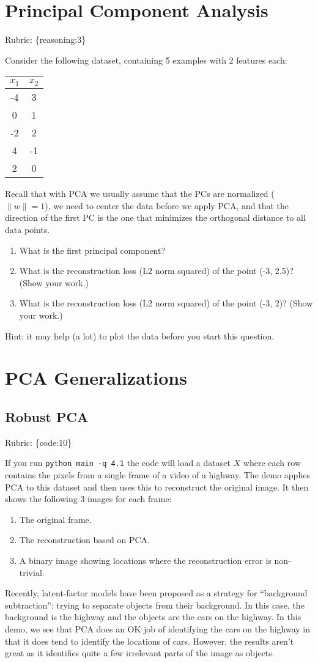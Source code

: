 \documentclass{article}
\def\rubric#1{\gre{Rubric: \{#1\}}}{}
\def\blu#1{{\color{blu}#1}}
\def\gre#1{{\color{gre}#1}}
\def\norm#1{\|#1\|}
\def\enum#1{\begin{enumerate}#1\end{enumerate}}
\begin{document}
\section{Principal Component Analysis}
\rubric{reasoning:3}


Consider the following dataset, containing 5 examples with 2 features each:
\begin{center}
\begin{tabular}{cc}
$x_1$ & $x_2$\\
\hline
-4 & 3\\
0 & 1\\
-2 & 2\\
4 & -1\\
2 & 0\\
\end{tabular}
\end{center}
Recall that with PCA we usually assume that the PCs are normalized ($\norm{w} = 1$), we need to center the data before we apply PCA, and that the direction of the first PC is the one that minimizes the orthogonal distance to all data points.
\blu{
\enum{
\item What is the first principal component?
\item What is the reconstruction loss (L2 norm squared) of the point (-3, 2.5)? (Show your work.)
\item What is the reconstruction loss (L2 norm squared) of the point (-3, 2)? (Show your work.)
}
}
Hint: it may help (a lot) to plot the data before you start this question.



\section{PCA Generalizations}

\subsection{Robust PCA}
\rubric{code:10}

If you run \verb|python main -q 4.1| the code will load a dataset $X$ where each row contains the pixels from a single frame of a video of a highway. The demo applies PCA to this dataset and then uses this to reconstruct the original image.
It then shows the following 3 images for each frame:
\enum{
\item The original frame.
\item The reconstruction based on PCA.
\item A binary image showing locations where the reconstruction error is non-trivial.
}
Recently, latent-factor models have been proposed as a strategy for ``background subtraction'': trying to separate objects from their background. In this case, the background is the highway and the objects are the cars on the highway. In this demo, we see that PCA does an OK job of identifying the cars on the highway in that it does tend to identify the locations of cars. However, the results aren't great as it identifies quite a few irrelevant parts of the image as objects.
\end{document}
